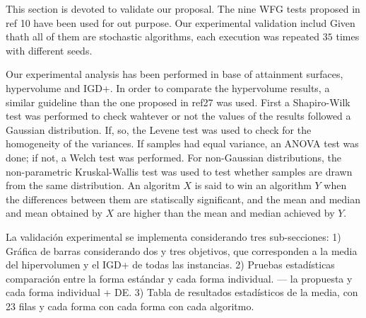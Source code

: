 This section is devoted to validate our proposal.
%
The nine WFG tests proposed in ref 10 have been used for out purpose.
%
Our experimental validation includ
%
Given thath all of them are stochastic algorithms, each execution was repeated $35$ times with different seeds.
%

Our experimental analysis has been performed in base of attainment surfaces, hypervolume and IGD+.
%
In order to comparate the hypervolume results, a similar guideline than the one proposed in ref27 was used.
%
First a Shapiro-Wilk test was performed to check wahtever or not the values of the results followed a Gaussian distribution.
%
If, so, the Levene test was used to check for the homogeneity of the variances.
%
If samples had equal variance, an ANOVA test was done;
%
if not, a Welch test was performed.
%
For non-Gaussian distributions, the non-parametric Kruskal-Wallis test was used to test whether samples are drawn from the same distribution.
%
An algoritm $X$ is said to win an algorithm $Y$ when the differences between them are statiscally significant, and the mean and median and mean obtained by $X$ are higher than the mean and median achieved by $Y$.

La validación experimental se implementa considerando tres sub-secciones:
1) Gráfica de barras considerando dos y tres objetivos, que corresponden a la media del hipervolumen y el IGD+ de todas las instancias.
2) Pruebas estadísticas comparación entre la forma estándar y cada forma individual. --- la propuesta y cada forma individual + DE.
3) Tabla de resultados estadísticos de la media, con 23 filas y cada forma con cada forma con cada algoritmo.


